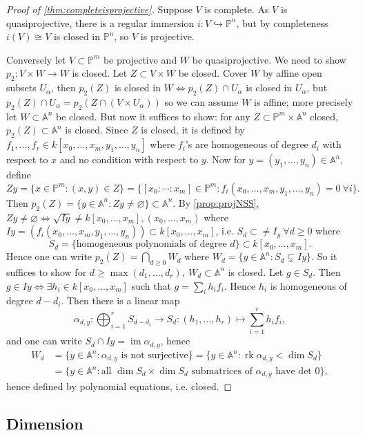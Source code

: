 \documentclass{article}
\newcommand{\A}{\mathbb{A}}
\newcommand{\p}{\mathbb{P}}
\newcommand{\im}{\operatorname{im}}
\newcommand{\rk}{\operatorname{rk}}
\theoremstyle{definition}
\begin{document}
\begin{proof}[Proof of \ref{thm:completeisprojective}]
Suppose $V$ is complete. As $V$ is quasiprojective, there is a regular immersion $i:V\hookrightarrow\p^n$, but by completeness $i(V)\cong V$ is closed in $\p^n$, so $V$ is projective.

Conversely let $V\subset\p^m$ be projective and $W$ be quasiprojective. We need to show $p_2:V\times W\rightarrow W$ is closed. Let $Z\subset V\times W$ be closed. Cover $W$ by affine open subsets $U_\alpha$, then $p_2(Z)$ is closed in $W\iff p_2(Z)\cap U_\alpha$ is closed in $U_\alpha$, but $p_2(Z)\cap U_\alpha=p_2(Z\cap(V\times U_\alpha))$ so we can assume $W$ is affine; more precisely let $W\subset\A^n$ be closed. But now it suffices to show: for any $Z\subset\p^m\times\A^n$ closed, $p_2(Z)\subset\A^n$ is closed. Since $Z$ is closed, it is defined by $f_1,\ldots,f_r\in k[x_0,\ldots,x_m,y_1,\ldots,y_n]$ where $f_i$'s are homogeneous of degree $d_i$ with respect to $x$ and no condition with respect to $y$. Now for $y=(y_1,\ldots,y_n)\in\A^n$, define
\[
Zy=\{x\in\p^m:(x,y)\in Z\}=\{[x_0:\cdots:x_m]\in\p^m:f_i(x_0,\ldots,x_m,y_1,\ldots,y_n)=0 \ \forall i\}.
\]
Then $p_2(Z)=\{y\in\A^n:Zy\neq\varnothing\}\subset\A^n$. By \ref{prop:projNSS}, $Zy\neq\varnothing\iff\sqrt{Iy}\neq k[x_0,\ldots,x_m],(x_0,\ldots,x_m)$ where $Iy=\left(f_i(x_0,\ldots,x_m,y_1,\ldots,y_n)\right)\subset k[x_0,\ldots,x_m]$, i.e. $S_d\subset\neq I_y \ \forall d\geq 0$ where
\[
S_d=\{\text{homogeneous polynomials of degree }d\}\subset k[x_0,\ldots,x_m].
\]
Hence one can write $p_2(Z)=\bigcap_{d\geq 0}W_d$ where $W_d=\{y\in\A^n:S_d\subsetneq Iy\}$. So it suffices to show for $d\geq\max(d_1,\ldots,d_r),\ W_d\subset\A^n$ is closed. Let $g\in S_d$. Then $g\in Iy\iff \exists h_i\in k[x_0,\ldots,x_m]$ such that $g=\sum_i h_if_i$. Hence $h_i$ is homogeneous of degree $d-d_i$. Then there is a linear map
\[
\alpha_{d,y}:\bigoplus_{i=1}^r S_{d-d_i}\rightarrow S_d:(h_1,\ldots,h_r)\mapsto\sum_{i=1}^r h_if_i,
\]
and one can write $S_d\cap Iy=\im\alpha_{d,y}$, hence
\[
\begin{aligned}
W_d&=\{y\in\A^n:\alpha_{d,y}\text{ is not surjective}\}=\{y\in\A^n:\rk\alpha_{d,y}<\dim S_d\}\\
&=\{y\in\A^n:\text{all }\dim S_d\times\dim S_d\text{ submatrices of }\alpha_{d,y}\text{ have det }0\},
\end{aligned}
\]
hence defined by polynomial equations, i.e. closed.
\end{proof}

\subsection{Dimension}
\end{document}
